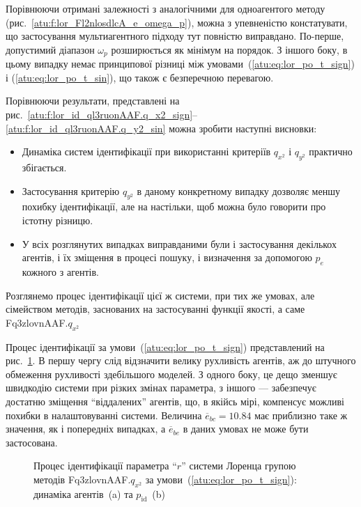 Порівнюючи отримані залежності з аналогічними для
одноагентого методу (рис.~\ref{atu:f:lor_Fl2nlosdlcA_e_omega_p}), можна з
упевненістю констатувати, що застосування мультиагентного
підходу тут повністю виправдано. По-перше, допустимий діапазон
$\omega_p $ розширюється як мінімум на порядок. З іншого боку, в цьому
випадку немає принципової різниці між умовами~(\ref{atu:eq:lor_po_t_sign})
і (\ref{atu:eq:lor_po_t_sin}), що також є безперечною перевагою.




Порівнюючи результати, представлені на
рис.~\ref{atu:f:lor_id_ql3ruonAAF.q_x2_sign}--\ref{atu:f:lor_id_ql3ruonAAF.q_y2_sin} можна зробити
наступні висновки:

\begin{itemize}

  \item
   Динаміка систем ідентифікації при використанні критеріїв $q_{x^2}$ і $q_{y^2}$ практично збігається.

  \item
    Застосування критерію
    $q_{y^2}$ в даному конкретному випадку дозволяє меншу похибку
    ідентифікації, але на настільки, щоб можна було говорити про
    істотну різницю.

  \item
    У всіх розглянутих випадках виправданими були і застосування
    декількох агентів, і їх зміщення в процесі пошуку, і визначення
    за допомогою
    $p_e$ кожного з агентів.

\end{itemize}

Розглянемо процес ідентифікації цієї ж системи, при тих же
умовах, але сімейством методів, заснованих на застосуванні
функції якості, а саме
Fq3zlovnAAF.$q_{x^2}$

Процес ідентифікації за умови~(\ref{atu:eq:lor_po_t_sign}) представлений
на рис.~\ref{atu:f:lor_id_Fq3zlovnAAF.q_x2_sign}. В першу чергу слід відзначити
велику рухливість агентів, аж до штучного обмеження рухливості
здебільшого моделей. З одного боку, це дещо зменшує швидкодію
системи при різких змінах параметра, з іншого --- забезпечує
достатню зміщення ``віддалених'' агентів, що, в якійсь мірі,
компенсує можливі похибки в налаштовуванні системи. Величина
$\overline{e}_{bc} = 10.84 $ має приблизно таке ж значення, як і попередніх
випадках, а
$\overline{e}_{be} $ в даних умовах не може бути застосована.

\begin{figure}[htb!]
  \caption{Процес ідентифікації параметра ``$r$'' системи Лоренца групою методів Fq3zlovnAAF.$q_{x^2} $ за умови~(\ref{atu:eq:lor_po_t_sign}): динаміка агентів~(a) та $p_\mathrm{id}$~(b)}
  \label{atu:f:lor_id_Fq3zlovnAAF.q_x2_sign}
\end{figure}

